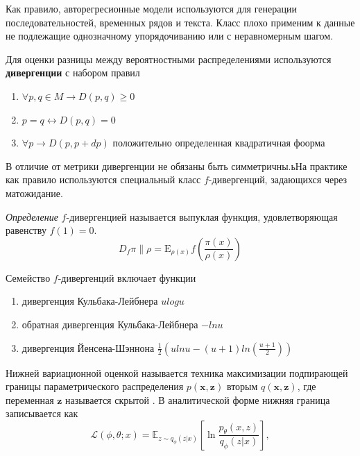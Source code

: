 Как правило, авторегресионные модели используются для генерации последовательностей, временных рядов и текста.
Класс плохо применим к данные не подлежащие однозначному упорядочиванию или с неравномерным шагом. 

Для оценки разницы между вероятностными распределениями используются \textbf{дивергенции} с набором правил \begin{enumerate}
    \item $\forall p,q \in M \rightarrow D(p,q) \ge 0$  
    \item $p=q \leftrightarrow D(p,q) = 0$
    \item $\forall p \rightarrow D(p,p+dp)$ положительно определенная квадратичная фоорма  
\end{enumerate}

В отличие  от метрики дивергенции не обязаны быть симметричны.ьНа практике как правило используются специальный класс $f$-дивергенций, задающихся
через матожидание.

\textit{Определение} $f$-дивергенцией называется выпуклая функция, удовлетворяющая равенству $f(1)=0$.
$$
    D_f{\pi \parallel \rho} = \mathrm E_{\rho(x)} f\left(\frac{\pi(x)}{\rho(x)}\right)
$$

Семейство $f$-дивергенций включает функции \begin{enumerate}
    \item дивергенция Кульбака-Лейбнера $u logu $
    \item обратная дивергенция Кульбака-Лейбнера $-ln u$
    \item дивергенция Йенсена-Шэннона  $\frac{1}{2}\left(u ln u - (u+1) ln(\frac{u+1}{2})\right)$
\end{enumerate}


Нижней вариационной оценкой называется техника максимизации подпирающей границы параметрического распределения $p(\mathbf{x},\mathbf{z})$ вторым $q(\mathbf{x},\mathbf{z})$,
где переменная $\mathbf{z}$ называется скрытой . В аналитической форме нижняя граница записывается как 
$$
    \mathcal{L}(\phi,\theta;x) = \mathbb{E}_{z \sim q_\phi(z|x)} \left[\ln \frac{p_{\theta}(x,z)}{q_{\phi}(z|x)}\right],
$$


